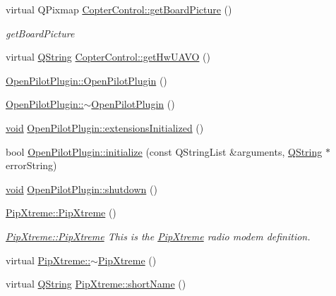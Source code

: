 \begin{DoxyCompactItemize}
virtual Q\-Pixmap \hyperlink{group___boards___open_pilot_plugin_ga06b9d173fe63133904394ae9f15d48ba}{Copter\-Control\-::get\-Board\-Picture} ()
\begin{DoxyCompactList}\small\item\em get\-Board\-Picture \end{DoxyCompactList}\item 
virtual \hyperlink{group___u_a_v_objects_plugin_gab9d252f49c333c94a72f97ce3105a32d}{Q\-String} \hyperlink{group___boards___open_pilot_plugin_ga844238f46b4df3aaf945874c9a6797ca}{Copter\-Control\-::get\-Hw\-U\-A\-V\-O} ()
\item 
\hyperlink{group___boards___open_pilot_plugin_ga3f890f5e776f6d5a0f6f23dd2d4976c9}{Open\-Pilot\-Plugin\-::\-Open\-Pilot\-Plugin} ()
\item 
\hyperlink{group___boards___open_pilot_plugin_gaa7eeef25853bb55d85427e94ceff9fa2}{Open\-Pilot\-Plugin\-::$\sim$\-Open\-Pilot\-Plugin} ()
\item 
\hyperlink{group___u_a_v_objects_plugin_ga444cf2ff3f0ecbe028adce838d373f5c}{void} \hyperlink{group___boards___open_pilot_plugin_gab3fcd8373403dc09fc4d868fdb8f5d23}{Open\-Pilot\-Plugin\-::extensions\-Initialized} ()
\item 
bool \hyperlink{group___boards___open_pilot_plugin_ga542bd2673508b0755f349632da3bd145}{Open\-Pilot\-Plugin\-::initialize} (const Q\-String\-List \&arguments, \hyperlink{group___u_a_v_objects_plugin_gab9d252f49c333c94a72f97ce3105a32d}{Q\-String} $\ast$error\-String)
\item 
\hyperlink{group___u_a_v_objects_plugin_ga444cf2ff3f0ecbe028adce838d373f5c}{void} \hyperlink{group___boards___open_pilot_plugin_gab41fd915d672acefc699cd2185ac1037}{Open\-Pilot\-Plugin\-::shutdown} ()
\item 
\hyperlink{group___boards___open_pilot_plugin_ga933d096d4ca64fb4d20fc5501d21fe24}{Pip\-Xtreme\-::\-Pip\-Xtreme} ()
\begin{DoxyCompactList}\small\item\em \hyperlink{group___boards___open_pilot_plugin_ga933d096d4ca64fb4d20fc5501d21fe24}{Pip\-Xtreme\-::\-Pip\-Xtreme} This is the \hyperlink{class_pip_xtreme}{Pip\-Xtreme} radio modem definition. \end{DoxyCompactList}\item 
virtual \hyperlink{group___boards___open_pilot_plugin_ga6a493453ee4e734933fca8caf5b92b7c}{Pip\-Xtreme\-::$\sim$\-Pip\-Xtreme} ()
\item 
virtual \hyperlink{group___u_a_v_objects_plugin_gab9d252f49c333c94a72f97ce3105a32d}{Q\-String} \hyperlink{group___boards___open_pilot_plugin_ga3267a634ade3947a6463a2aaae145c1b}{Pip\-Xtreme\-::short\-Name} ()

\end{DoxyCompactItemize}
